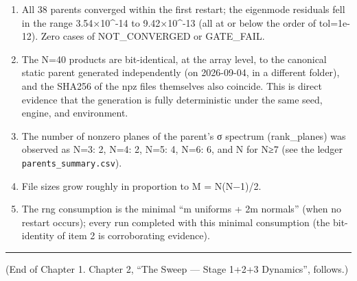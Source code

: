 \documentclass[
  a4paper,
]{ltjsarticle}
\providecommand{\tightlist}{%
  \setlength{\itemsep}{0pt}\setlength{\parskip}{0pt}}
\begin{document}
\begin{enumerate}
\def\labelenumi{\arabic{enumi}.}
\tightlist
\item
  All 38 parents converged within the first restart; the eigenmode
  residuals fell in the range 3.54×10\^{}-14 to 9.42×10\^{}-13 (all at
  or below the order of tol=1e-12). Zero cases of NOT\_CONVERGED or
  GATE\_FAIL.
\item
  The N=40 products are bit-identical, at the array level, to the
  canonical static parent generated independently (on 2026-09-04, in a
  different folder), and the SHA256 of the npz files themselves also
  coincide. This is direct evidence that the generation is fully
  deterministic under the same seed, engine, and environment.
\item
  The number of nonzero planes of the parent's σ spectrum (rank\_planes)
  was observed as N=3: 2, N=4: 2, N=5: 4, N=6: 6, and N for N≥7 (see the
  ledger \texttt{parents\_summary.csv}).
\item
  File sizes grow roughly in proportion to M = N(N−1)/2.
\item
  The rng consumption is the minimal ``m uniforms + 2m normals'' (when
  no restart occurs); every run completed with this minimal consumption
  (the bit-identity of item 2 is corroborating evidence).
\end{enumerate}

\begin{center}\rule{0.5\linewidth}{0.5pt}\end{center}

(End of Chapter 1. Chapter 2, ``The Sweep --- Stage 1+2+3 Dynamics'',
follows.)
\end{document}
